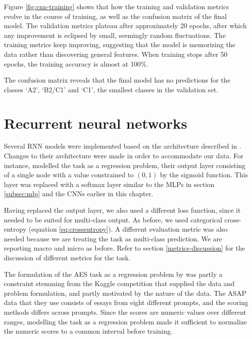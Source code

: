 Figure \ref{fig:cnn-training} shows that how the training and validation
metrics evolve in the course of training, as well as the confusion matrix of
the final model. The validation metrics plateau after approximately 20
epochs, after which any improvement is eclipsed by small, seemingly random
fluctuations. The training metrics keep improving, suggesting that the model
is memorizing the data rather than discovering general features. When
training stops after 50 epochs, the training accuracy is almost at 100\%.

The confusion matrix reveals that the final model has no predictions for the
classes `A2', `B2/C1' and `C1', the smallest classes in the validation set.


\section{Recurrent neural networks}

Several \ac{RNN} models were implemented based on the architecture described in
\textcite{taghipour16}. Changes to their architecture were made in
order to accommodate our data. For instance, \citeauthor{taghipour16} modelled
the task as a regression problem, their output layer consisting of a single
node with a value constrained to $(0,1)$ by the sigmoid function. This layer
was replaced with a softmax layer similar to the \acp{MLP} in section
\ref{subsec:mlp} and the \acp{CNN} earlier in this chapter.

Having replaced the output layer, we also used a different loss function,
since it needed to be suited for multi-class output. As before, we used
categorical cross-entropy (equation \ref{eq:crossentropy}). A different
evaluation metric was also needed because we are treating the task as
multi-class prediction. We are reporting macro and micro \FI as before. Refer
to section \ref{metrics-discussion} for the discussion of different metrics
for the task.

The formulation of the \ac{AES} task as a regression problem by
\citeauthor{taghipour16} was partly a constraint stemming from the Kaggle
competition that supplied the data and problem formulation, and partly
motivated by the nature of the data. The ASAP data that they use consists of
essays from eight different prompts, and the scoring methods differs across
prompts. Since the scores are numeric values over different ranges, modelling
the task as a regression problem made it sufficient to normalize the numeric
scores to a common interval before training.

